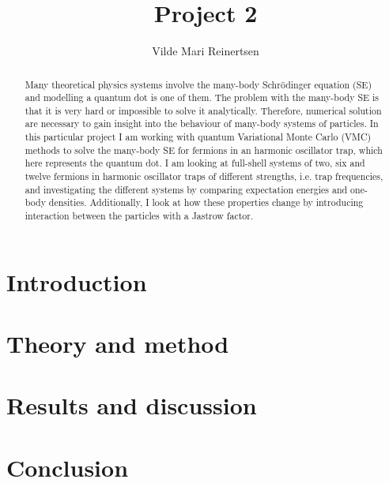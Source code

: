 \documentclass[a4paper,12pt]{article}
\date{}
\author{Vilde Mari Reinertsen}
\title{Project 2}
\begin{document}
\begingroup
\let\center\flushleft
\let\endcenter\endflushleft
\maketitle
\endgroup

\begin{abstract}
Many theoretical physics systems involve the many-body Schrödinger equation (SE) and modelling a quantum dot is one of them. The problem with the many-body SE is that it is very hard or impossible to solve it analytically. Therefore, numerical solution are necessary to gain insight into the behaviour of many-body systems of particles. In this particular project I am working with quantum Variational Monte Carlo (VMC) methods to solve the many-body SE for fermions in an harmonic oscillator trap, which here represents the quantum dot. I am looking at full-shell systems of two, six and twelve fermions in harmonic oscillator traps of different strengths, i.e. trap frequencies, and investigating the different systems by comparing expectation energies and one-body densities. Additionally, I look at how these properties change by introducing interaction between the particles with a Jastrow factor. 
\end{abstract}

\tableofcontents

\section{Introduction}


\section{Theory and method}


\section{Results and discussion}


\section{Conclusion}


\begin{appendices}

\end{appendices}


\newpage

\end{document}
